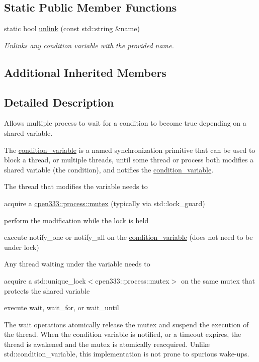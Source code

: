 \subsection*{Static Public Member Functions}
\begin{DoxyCompactItemize}
\item 
static bool \hyperlink{classcpen333_1_1process_1_1condition__variable_aa9c5da7417ff6c6f79d8b58333e309f8}{unlink} (const std\+::string \&name)
\begin{DoxyCompactList}\small\item\em Unlinks any condition variable with the provided name. \end{DoxyCompactList}\end{DoxyCompactItemize}
\subsection*{Additional Inherited Members}


\subsection{Detailed Description}
Allows multiple process to wait for a condition to become {\ttfamily true} depending on a shared variable. 

The \hyperlink{classcpen333_1_1process_1_1condition__variable}{condition\+\_\+variable} is a named synchronization primitive that can be used to block a thread, or multiple threads, until some thread or process both modifies a shared variable (the condition), and notifies the \hyperlink{classcpen333_1_1process_1_1condition__variable}{condition\+\_\+variable}.

The thread that modifies the variable needs to 
\begin{DoxyItemize}
\item acquire a \hyperlink{classcpen333_1_1process_1_1mutex}{cpen333\+::process\+::mutex} (typically via std\+::lock\+\_\+guard) 
\item perform the modification while the lock is held 
\item execute notify\+\_\+one or notify\+\_\+all on the \hyperlink{classcpen333_1_1process_1_1condition__variable}{condition\+\_\+variable} (does not need to be under lock) 
\end{DoxyItemize}Any thread waiting under the variable needs to 
\begin{DoxyItemize}
\item acquire a std\+::unique\+\_\+lock$<$cpen333\+::process\+::mutex$>$ on the same mutex that protects the shared variable 
\item execute wait, wait\+\_\+for, or wait\+\_\+until 
\end{DoxyItemize}The wait operations atomically release the mutex and suspend the execution of the thread. When the condition variable is notified, or a timeout expires, the thread is awakened and the mutex is atomically reacquired. Unlike std\+::condition\+\_\+variable, this implementation is not prone to spurious wake-\/ups. 

